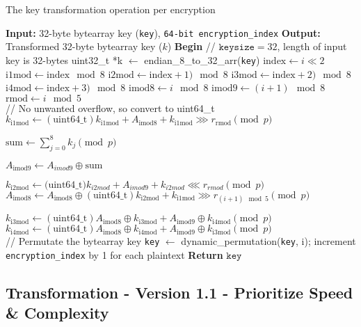 \documentclass[fleqn, a4paper,12pt]{article}
\newcommand{\COMMENT}[1]{\State \textcolor[HTML]{003e57}{// #1}}
\begin{document}
\begin{algorithm}[H] %
\caption{The key transformation operation per encryption}
\begin{algorithmic}[1]  %
\State \textbf{Input:} 32-byte bytearray key (\texttt{key}), \texttt{64-bit encryption\_index}
\State \textbf{Output:} Transformed 32-byte bytearray key ($k$)
\State \textbf{Begin}
\COMMENT{$\texttt{keysize} = 32$, length of input key is 32-bytes}
\State uint32\_t *k $\gets$ endian\_8\_to\_32\_arr(\texttt{key})
	\State $\mathrm{index} \gets i \ll 2$
	\State $\mathrm{i1mod} \gets \mathrm{index} \mod 8$
	\State $\mathrm{i2mod} \gets \mathrm{index}+1) \mod 8$
	\State $\mathrm{i3mod} \gets \mathrm{index}+2) \mod 8$
	\State $\mathrm{i4mod} \gets \mathrm{index}+3) \mod 8$
	\State $\mathrm{imod8} \gets i \mod 8$
	\State $\mathrm{imod9} \gets (i+1) \mod 8$
	\State $\mathrm{rmod} \gets i \mod 5$ \\

	\COMMENT{No unwanted overflow, so convert to uint64\_t}
	\State $k_\mathrm{i1mod} \gets \mathrm{(uint64\_t)} k_\mathrm{i1mod} + A_\mathrm{imod8} + k_\mathrm{i1mod} \ggg r_\mathrm{rmod}  \pmod p $

	\State $ \mathrm{sum} \gets \displaystyle \sum_{j=0}^8 k_j \pmod p $

	\State $A_\mathrm{imod9} \gets A_{imod9} \oplus \text{sum}$

	\State $k_\mathrm{i2mod} \gets \text{(uint64\_t)} k_{i2mod} + A_{imod9} + k_{i2mod} \lll r_{rmod} \pmod p$
	\State $A_\mathrm{imod8} \gets A_\mathrm{imod8} \oplus \mathrm{(uint64\_t)} k_\mathrm{i2mod} + k_\mathrm{i1mod} \ggg r_{(i+1) \mod 5} \pmod p$

	\State $k_\mathrm{i3mod} \gets \mathrm{(uint64\_t)} A_\mathrm{imod8} \oplus k_\mathrm{i3mod} + A_\mathrm{imod9} \oplus k_\mathrm{i4mod} \pmod p$
	\State $k_\mathrm{i4mod} \gets  \mathrm{(uint64\_t)} A_\mathrm{imod8} \oplus k_\mathrm{i4mod} + A_\mathrm{imod9} \oplus k_\mathrm{i3mod} \pmod p$ \\

	\COMMENT{Permutate the bytearray key}
	\State \texttt{key} $\gets$ dynamic\_permutation(\texttt{key}, i);
\State increment \texttt{encryption\_index} by 1 for each plaintext
\EndFor
\State \textbf{Return} $\texttt{key}$
\end{algorithmic}
\end{algorithm}

\subsection{Transformation - Version 1.1 - Prioritize Speed \& Complexity}
\end{document}

